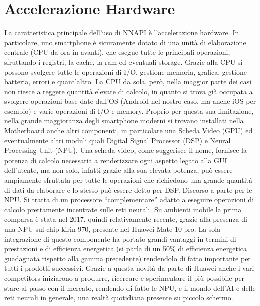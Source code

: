 \section{Accelerazione Hardware}
La caratteristica principale dell’uso di NNAPI\cite{NNAPI} è l’accelerazione hardware. In particolare, uno smartphone è sicuramente dotato di una unità di elaborazione
centrale (CPU da ora in avanti), che esegue tutte le principali operazioni, sfruttando i registri, la cache, la ram ed eventuali storage. Grazie alla CPU
si possono svolgere tutte le operazioni di I/O, gestione memoria, grafica, gestione batteria, errori e quant’altro.
La CPU da sola, però, nella maggior parte dei casi non riesce a reggere quantità elevate di calcolo, in quanto si trova già occupata a svolgere operazioni
base date dall’OS (Android nel nostro caso, ma anche iOS per esempio) e varie operazioni di I/O e memory. Proprio per questa sua limitazione, nella grande
maggioranza degli smartphone moderni si trovano installati nella Motherboard anche altri componenti, in particolare una Scheda Video (GPU) ed eventualmente
altri moduli quali Digital Signal Processor (DSP) e Neural Processing Unit (NPU). 
Una scheda video, come suggerisce il nome, fornisce la potenza di calcolo necessaria a renderizzare ogni aspetto legato alla GUI dell’utente, ma non solo,
infatti grazie alla sua elevata potenza, può essere ampiamente sfruttata per tutte le operazioni che richiedono una grande quantità di dati da elaborare e
lo stesso può essere detto per DSP. 
Discorso a parte per le NPU. Si tratta di un processore “complementare” adatto a eseguire operazioni di calcolo prettamente incentrate sulle reti neurali.
Su ambienti mobile la prima comparsa è stata nel 2017, quindi relativamente recente, grazie alla presenza di una NPU sul chip kirin 970, presente nel Huawei
Mate 10 pro.
La sola integrazione di questo componente ha portato grandi vantaggi in termini di prestazioni e di efficienza energetica (si parla di un 50\% di efficienza
energetica guadagnata rispetto alla gamma precedente) rendendolo di fatto importante per tutti i prodotti successivi. Grazie a questa novità da parte di
Huawei anche i vari competitors iniziarono a produrre, ricercare e sperimentare il più possibile per stare al passo con il mercato, rendendo di fatto le NPU,
e il mondo dell’AI e delle reti neurali in generale, una realtà quotidiana presente su piccolo schermo.

